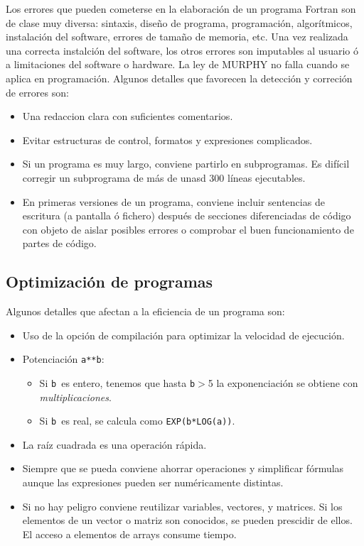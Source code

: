 Los errores que pueden cometerse en la elaboración de un programa Fortran son de clase muy diversa: sintaxis, diseño de programa, programación, algorítmicos, instalación del software, errores de tamaño de memoria, etc. Una vez realizada una correcta instalción del software, los otros errores son imputables al usuario ó a limitaciones del software o hardware. La ley de MURPHY no falla cuando se aplica en programación. Algunos detalles que favorecen la detección y correción de errores son:

\begin{itemize}
	\item Una redaccion clara con suficientes comentarios.
	\item Evitar estructuras de control, formatos y expresiones complicados.
	\item Si un programa es muy largo, conviene partirlo en subprogramas. Es difícil corregir un subprograma de más de unasd 300 líneas ejecutables.
	\item En primeras versiones de un programa, conviene incluir sentencias de escritura (a pantalla ó fichero) después de secciones diferenciadas de código con objeto de aislar posibles errores o comprobar el buen funcionamiento de partes de código.
\end{itemize}


\subsection{Optimización de programas}

Algunos detalles que afectan a la eficiencia de un programa son:

\begin{itemize}
	\item Uso de la opción de compilación para optimizar la velocidad de ejecución.
	\item Potenciación {\tt a**b}:
	      \begin{itemize}
		      \item Si {\tt b }es entero, tenemos que hasta {\tt b}$>$5 la exponenciación se obtiene con {\it multiplicaciones}.
		      \item Si {\tt b }es real, se calcula como {\tt EXP(b*LOG(a))}.
	      \end{itemize}
	\item La raíz cuadrada es una operación rápida.
	\item Siempre que se pueda conviene ahorrar operaciones y simplificar fórmulas aunque las expresiones pueden ser numéricamente distintas.
	\item Si no hay peligro conviene reutilizar variables, vectores, y matrices. Si los elementos de un vector o matriz son conocidos, se pueden prescidir de ellos. El acceso a elementos de arrays consume tiempo.
\end{itemize}